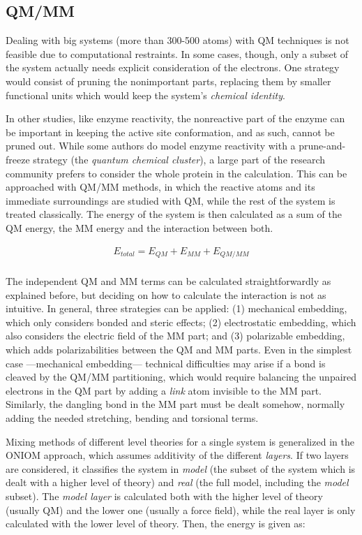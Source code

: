 \subsection{QM/MM}
\label{section:qmmm}

Dealing with big systems (more than 300-500 atoms) with QM techniques is not feasible due to computational restraints. In some cases, though, only a subset of the system actually needs explicit consideration of the electrons. One strategy would consist of pruning the nonimportant parts, replacing them by smaller functional units which would keep the system's \textit{chemical identity}.

In other studies, like enzyme reactivity, the nonreactive part of the enzyme can be important in keeping the active site conformation, and as such, cannot be pruned out. While some authors do model enzyme reactivity with a prune-and-freeze strategy (the \textit{quantum chemical cluster}\cite{siegbahn2009recent}), a large part of the research community prefers to consider the whole protein in the calculation. This can be approached with QM/MM methods, in which the reactive atoms and its immediate surroundings are studied with QM, while the rest of the system is treated classically. The energy of the system is then calculated as a sum of the QM energy, the MM energy and the interaction between both.


\begin{align}
	E_{total}=E_{QM}+E_{MM}+E_{QM/MM} \\ \tag{QM/MM energy}
\end{align}


The independent QM and MM terms can be calculated straightforwardly as explained before, but deciding on how to calculate the interaction is not as intuitive. In general, three strategies can be applied: (1) mechanical embedding, which only considers bonded and steric effects; (2) electrostatic embedding, which also considers the electric field of the MM part; and (3) polarizable embedding, which adds polarizabilities between the QM and MM parts. Even in the simplest case ---mechanical embedding--- technical difficulties may arise if a bond is cleaved by the QM/MM partitioning, which would require balancing the unpaired electrons in the QM part by adding a \textit{link} atom invisible to the MM part. Similarly, the dangling bond in the MM part must be dealt somehow, normally adding the needed stretching, bending and torsional terms.

Mixing methods of different level theories for a single system is generalized in the ONIOM approach, which assumes additivity of the different \textit{layers}. If two layers are considered, it classifies the system in \textit{model} (the subset of the system which is dealt with a higher level of theory) and \textit{real} (the full model, including the \textit{model} subset). The \textit{model layer} is calculated both with the higher level of theory (usually QM) and the lower one (usually a force field), while the real layer is only calculated with the lower level of theory. Then, the energy is given as:

